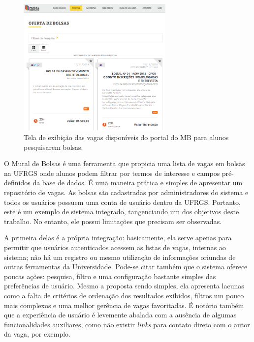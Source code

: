 \begin{figure}[H]
    \caption{Tela de exibição das vagas disponíveis do portal do MB para alunos pesquisarem bolsas.}
       	\begin{center}
            \includegraphics[width=0.68\textwidth]{figuras/rel07.png}
        \end{center}
    \label{telaVagasMB}
\end{figure}

O Mural de Bolsas é uma ferramenta que propicia uma lista de vagas em bolsas na UFRGS onde alunos podem filtrar por termos de interesse e campos pré-definidos da base de dados. É uma maneira prática e simples de apresentar um repositório de vagas. As bolsas são cadastradas por administradores do sistema e todos os usuários possuem uma conta de usuário dentro da UFRGS. Portanto, este é um exemplo de sistema integrado, tangenciando um dos objetivos deste trabalho. No entanto, ele possui limitações que precisam ser observadas. 

A primeira delas é a própria integração: basicamente, ela serve apenas para permitir que usuários autenticados acessem as listas de vagas, internas ao sistema; não há um registro ou mesmo utilização de informações oriundas de outras ferramentas da Universidade. Pode-se citar também que o sistema oferece poucas ações: pesquisa, filtro e uma configuração bastante simples das preferências de usuário. Mesmo a proposta sendo simples, ela apresenta lacunas como a falta de critérios de ordenação dos resultados exibidos, filtros um pouco mais complexos e uma melhor gerência de vagas favoritadas. É notório também que a experiência de usuário é levemente abalada com a ausência de algumas funcionalidades auxiliares, como não existir \textit{links} para contato direto com o autor da vaga, por exemplo.

